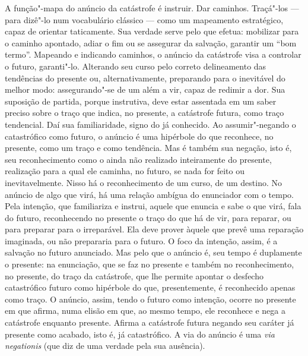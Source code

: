 A função"-mapa do anúncio da catástrofe é instruir. Dar caminhos.
Traçá"-los --- para dizê"-lo num vocabulário clássico --- como um
mapeamento estratégico, capaz de orientar taticamente. Sua verdade serve
pelo que efetua: mobilizar para o caminho apontado, adiar o fim ou se
assegurar da salvação, garantir um ``bom termo''. Mapeando e indicando
caminhos, o anúncio da catástrofe visa a controlar o futuro, garanti"-lo.
Alterando seu curso pelo correto delineamento das tendências do presente
ou, alternativamente, preparando para o inevitável do melhor modo:
assegurando"-se de um além a vir, capaz de redimir a dor. Sua suposição
de partida, porque instrutiva, deve estar assentada em um saber preciso
sobre o traço que indica, no presente, a catástrofe futura, como traço
tendencial. Daí sua familiaridade, signo do já conhecido. Ao
assumir"-negando o catastrófico como futuro, o anúncio é uma hipérbole do
que reconhece, no presente, como um traço e como tendência. Mas é também
sua negação, isto é, seu reconhecimento como o ainda não realizado
inteiramente do presente, realização para a qual ele caminha, no futuro,
se nada for feito ou inevitavelmente. Nisso há o reconhecimento de um
curso, de um destino. No anúncio de algo que virá, há uma relação
ambígua do enunciador com o tempo. Pela intenção, que familiariza e
instrui, aquele que enuncia e sabe o que virá, fala do futuro,
reconhecendo no presente o traço do que há de vir, para reparar, ou para
preparar para o irreparável. Ela deve prover àquele que prevê uma
reparação imaginada, ou não prepararia para o futuro. O foco da
intenção, assim, é a salvação no futuro anunciado. Mas pelo que o
anúncio é, seu tempo é duplamente o presente: na enunciação, que se faz
no presente e também no reconhecimento, no presente, do traço da
catástrofe, que lhe permite apontar o desfecho catastrófico futuro como
hipérbole do que, presentemente, é reconhecido apenas como traço. O
anúncio, assim, tendo o futuro como intenção, ocorre no presente em que
afirma, numa elisão em que, ao mesmo tempo, ele reconhece e nega a
catástrofe enquanto presente. Afirma a catástrofe futura negando seu
caráter já presente como acabado, isto é, já catastrófico. A via do
anúncio é uma \emph{via} \emph{negationis} (que diz de uma verdade pela
sua ausência).

